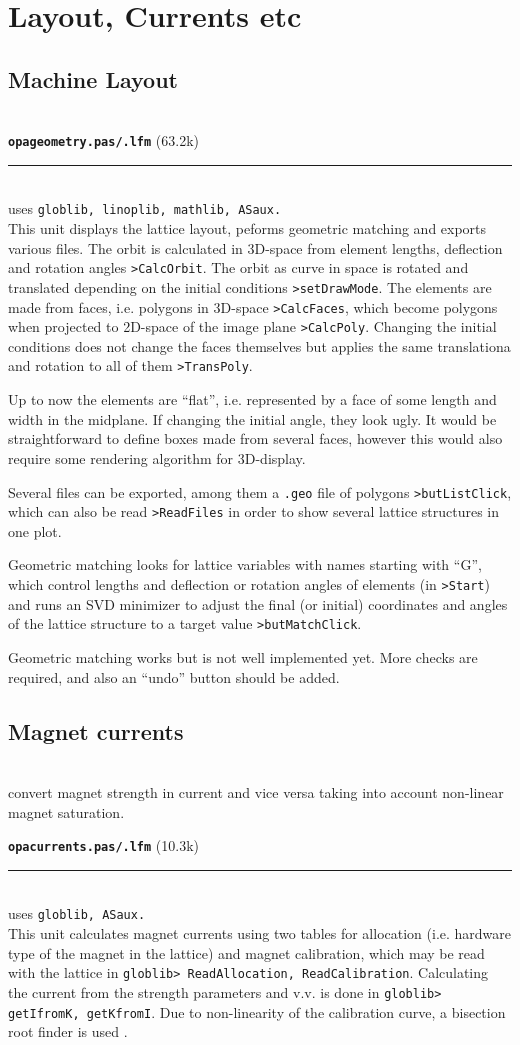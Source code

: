 \documentclass[12pt]{article}
\newcommand\code[1]{{\tt #1}}
\newcommand{\unico}[1]{{\color{burntorange}\code{#1}}}
\newcommand{\opagui}[1]{\colorbox{blue!20}{{\color{black}\code{#1}}}}
\newcommand{\oguih}[2]{\subsection{\label{#2}#1}{\Huge\opagui{#2}}\\}
\newcommand{\todo}[1]{{\color{red} #1}}
\newcommand\opamodule[3]{{\bf \tt #1} #2\\  \rule[3pt]{\textwidth}{0.2pt} \\ {\scriptsize uses \tt  #3}\\[1ex]}
\begin{document}
\section{\label{secelse}Layout, Currents etc}

\oguih{Machine Layout}{opageometry}


\opamodule{opageometry.pas/.lfm}{(63.2k)}{globlib, linoplib, mathlib, ASaux.}
This unit displays the lattice layout, peforms geometric matching and exports various files.
The orbit is calculated in 3D-space from element lengths, deflection and rotation angles \code{>CalcOrbit}. The orbit as curve in space is rotated and translated depending on the initial conditions \code{>setDrawMode}.
The elements are made from faces, i.e. polygons in 3D-space \code{>CalcFaces}, which become polygons when projected to 2D-space of the image plane \code{>CalcPoly}. Changing the initial conditions does not change the faces themselves but applies the same translationa and rotation to all of them \code{>TransPoly}.

\todo{Up to now the elements are ``flat'', i.e. represented by a face of some length and width in the midplane. If changing the initial angle, they look ugly. It would be straightforward to define boxes made from several faces, however this would also require some rendering algorithm for 3D-display.}

Several files can be exported, among them a \code{.geo} file of polygons \code{>butListClick}, which can also be read \code{>ReadFiles} in order to show several lattice structures in one plot.

Geometric matching looks for lattice variables with names starting with ``G'', which control lengths and deflection or rotation angles of elements (in \code{>Start}) and runs an SVD minimizer to adjust the final (or initial) coordinates and angles of the lattice structure to a target value \code{>butMatchClick}.

\todo{Geometric matching works but is not well implemented yet. More checks are required, and also an ``undo'' button should be added.}




\oguih{Magnet currents}{opacurrents}

\unico{getKfromI, getdKdIfac, getIfromK} convert  magnet strength in current and vice versa taking into account non-linear magnet saturation.

\opamodule{opacurrents.pas/.lfm}{(10.3k)}{globlib, ASaux.}
This unit calculates magnet currents using two tables for allocation (i.e. hardware type of the magnet in the lattice) and magnet calibration, which may be read with the lattice in \code{globlib> ReadAllocation, ReadCalibration}. Calculating the current from the strength parameters and v.v. is done in \code{globlib> getIfromK, getKfromI}. Due to non-linearity of the calibration curve, a bisection root finder is used \cite{numrec}.
\end{document}

